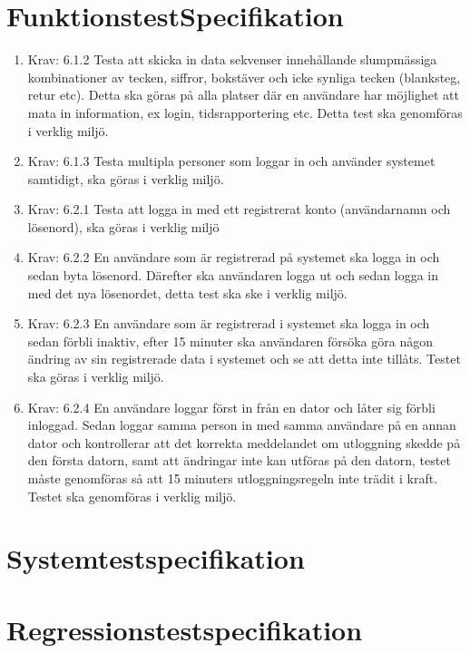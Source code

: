 \documentclass[a4paper]{article}
\begin{document}
\begin{appendices}

\section{FunktionstestSpecifikation}
\begin{enumerate}
\item Krav: 6.1.2
Testa att skicka in data sekvenser innehållande slumpmässiga kombinationer av tecken, siffror, bokstäver och icke synliga tecken (blanksteg, retur etc).
Detta ska göras på alla platser där en användare har möjlighet att mata in information, ex login, tidsrapportering etc. Detta test ska genomföras i verklig miljö.

\item Krav: 6.1.3
Testa multipla personer som loggar in och använder systemet samtidigt, ska göras i verklig miljö.

\item Krav: 6.2.1
Testa att logga in med ett registrerat konto (användarnamn och lösenord), ska göras i verklig miljö

\item Krav: 6.2.2
En användare som är registrerad på systemet ska logga in och sedan byta lösenord. 
Därefter ska användaren logga ut och sedan logga in med det nya lösenordet, detta test ska ske i verklig miljö.

\item Krav: 6.2.3
En användare som är registrerad i systemet ska logga in och sedan förbli inaktiv, efter 15 minuter ska användaren
försöka göra någon ändring av sin registrerade data i systemet och se att detta inte tillåts. Testet ska göras i verklig miljö.

\item Krav: 6.2.4
En användare loggar först in från en dator och låter sig förbli inloggad. Sedan loggar samma person in med samma användare på
en annan dator och kontrollerar att det korrekta meddelandet om utloggning skedde på den första datorn, samt att ändringar inte kan utföras
på den datorn, testet måste genomföras så att 15 minuters utloggningsregeln inte trädit i kraft. Testet ska genomföras i verklig miljö.
\end{enumerate}

\section{Systemtestspecifikation}

\section{Regressionstestspecifikation}

\end{appendices}
\end{document}
